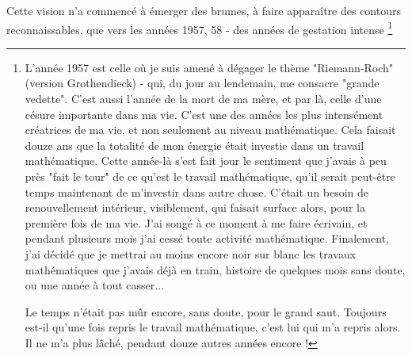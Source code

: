 Cette vision n'a commencé à émerger des brumes, à faire apparaître des contours reconnaissables, que vers les années 1957, 58 - des années de gestation intense \footnote{L'année 1957 est celle où je suis amené à dégager le thème "Riemann-Roch" (version Grothendieck) - qui, du jour au lendemain, me consacre "grande vedette". C'est aussi l'année de la mort de ma mère, et par là, celle d'une césure importante dans ma vie. C'est une des années les plus intensément créatrices de ma vie, et non seulement au niveau mathématique. Cela faisait douze ans que la totalité de mon énergie était investie dans un travail mathématique. Cette année-là s'est fait jour le sentiment que j'avais à peu près "fait le tour" de ce qu'est le travail mathématique, qu'il serait peut-être temps maintenant de m'investir dans autre chose. C'était un besoin de renouvellement intérieur, visiblement, qui faisait surface alors, pour la première fois de ma vie. J'ai songé à ce moment à me faire écrivain, et pendant plusieurs mois j'ai cessé toute activité mathématique. Finalement, j'ai décidé que je mettrai au moins encore noir sur blanc les travaux mathématiques que j'avais déjà en train, histoire de quelques mois sans doute, ou une année à tout casser...

Le temps n'était pas mûr encore, sans doute, pour le grand saut. Toujours est-il qu'une fois repris le travail mathématique, c'est lui qui m'a repris alors. Il ne m'a plus lâché, pendant douze autres années encore !

}
